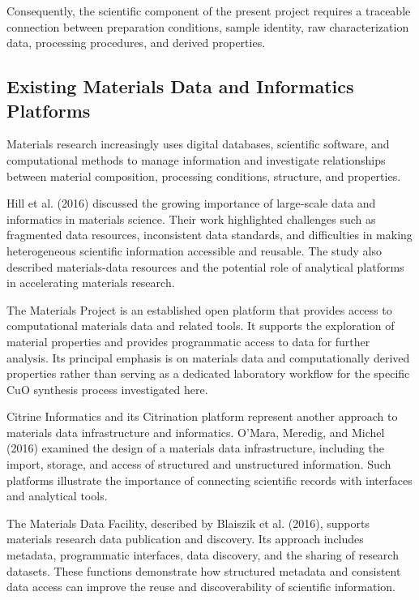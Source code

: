 \documentclass[12pt,a4paper,oneside]{report}
\begin{document}
{{{Consequently, the scientific component of the present project requires a traceable connection between preparation conditions, sample identity, raw characterization data, processing procedures, and derived properties.

\subsection{Existing Materials Data and Informatics Platforms}

Materials research increasingly uses digital databases, scientific software, and computational methods to manage information and investigate relationships between material composition, processing conditions, structure, and properties.

Hill et al. (2016) discussed the growing importance of large-scale data and informatics in materials science. Their work highlighted challenges such as fragmented data resources, inconsistent data standards, and difficulties in making heterogeneous scientific information accessible and reusable. The study also described materials-data resources and the potential role of analytical platforms in accelerating materials research.

The Materials Project is an established open platform that provides access to computational materials data and related tools. It supports the exploration of material properties and provides programmatic access to data for further analysis. Its principal emphasis is on materials data and computationally derived properties rather than serving as a dedicated laboratory workflow for the specific $\text{CuO}$ synthesis process investigated here.

Citrine Informatics and its Citrination platform represent another approach to materials data infrastructure and informatics. O'Mara, Meredig, and Michel (2016) examined the design of a materials data infrastructure, including the import, storage, and access of structured and unstructured information. Such platforms illustrate the importance of connecting scientific records with interfaces and analytical tools.

The Materials Data Facility, described by Blaiszik et al. (2016), supports materials research data publication and discovery. Its approach includes metadata, programmatic interfaces, data discovery, and the sharing of research datasets. These functions demonstrate how structured metadata and consistent data access can improve the reuse and discoverability of scientific information.

}}}
\end{document}
